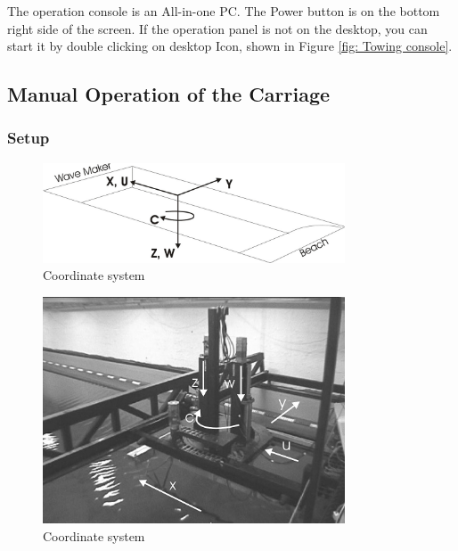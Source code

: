 \documentclass[a4paper,english]{report}
\begin{document}
The operation console is an All-in-one PC. The Power button is on the bottom right side of the screen. If the operation panel is not on the desktop, you can start it by double clicking on desktop Icon, shown in Figure \ref{fig: Towing console}.

\subsection{Manual Operation of the Carriage}
\subsubsection*{Setup}
\begin{figure}[htb!]
	\centering \includegraphics[width=0.8\textwidth]{fig/towing_coordinate_sketch}
	\caption{Coordinate system}
	\label{fig: Towing carriage-1}
\end{figure}

\begin{figure}[htb!]
	\centering \includegraphics[width=0.8\textwidth]{fig/towing_coordinate_photo}
	\caption{Coordinate system}
\end{figure}
\end{document}
